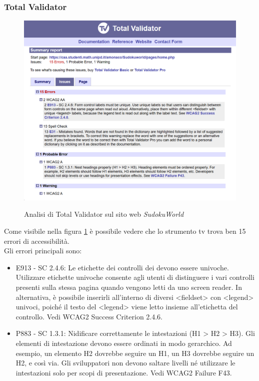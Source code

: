 \subsubsection{Total Validator}
\begin{figure}[H]
    \centering
    \includegraphics[width=0.7\linewidth, alt={Screenshot dell'analisi di Total Validator sul sito web SudokuWorld}]{img/TV_sudoku.png}
    \caption{Analisi di Total Validator sul sito web \textit{SudokuWorld}}\label{fig:TV_sudoku}
\end{figure}

\noindent Come visibile nella figura \ref{fig:TV_sudoku} è possibile vedere che lo strumento \acrshort{tv} trova ben 15 errori di accessibilità.\\
Gli errori principali sono: 
\begin{itemize}
    \item E913 - SC 2.4.6: Le etichette dei controlli dei  devono essere univoche. Utilizzare etichette univoche consente agli utenti di distinguere i vari controlli presenti sulla stessa pagina quando vengono letti da uno screen reader. In alternativa, è possibile inserirli all’interno di diversi <fieldset> con <legend> univoci, poiché il testo del <legend> viene letto insieme all’etichetta del controllo. Vedi WCAG2 Success Criterion 2.4.6.
    \item P883 - SC 1.3.1: Nidificare correttamente le intestazioni (H1 > H2 > H3). Gli elementi di intestazione devono essere ordinati in modo gerarchico. Ad esempio, un elemento H2 dovrebbe seguire un H1, un H3 dovrebbe seguire un H2, e così via. Gli sviluppatori non devono saltare livelli né utilizzare le intestazioni solo per scopi di presentazione. Vedi WCAG2 Failure F43.
\end{itemize}

